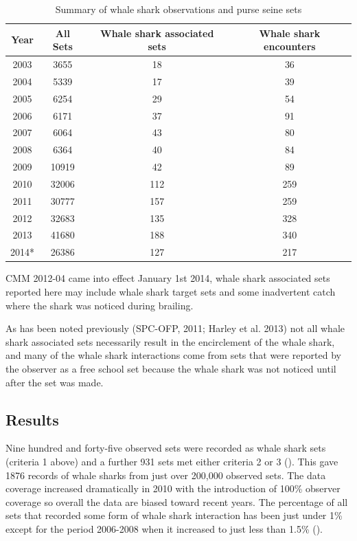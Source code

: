 \documentclass[12pt]{SCreport}
\begin{document}
\begin{table}[!h]
\label{tbl:whaleshark}
\begin{center}
\begin{tabular}{c|c|c|c}
Year & All Sets & Whale shark associated sets & Whale shark encounters\\
\hline
\hline
2003&	3655&	18&	36\\
2004&	5339&	17&	39\\
2005&	6254&	29&	54\\
2006&	6171&	37&	91\\
2007&	6064&	43&	80\\
2008&	6364&	40&	84\\
2009&	10919&	42&	89\\
2010&	32006&	112&	259\\
2011&	30777&	157&	259\\
2012&	32683&	135&	328\\
2013&	41680&	188&	340\\
2014*&	26386&	127&	217\\
\hline
\end{tabular}
\caption{Summary of whale shark observations and purse seine sets} 
\end{center}
\end{table}

CMM 2012-04 came into effect January 1st 2014, whale shark associated sets reported here may include whale shark target sets and some inadvertent catch where the shark was noticed during brailing.

As has been noted previously (SPC-OFP, 2011; Harley et al. 2013) not all whale shark associated sets necessarily result in the encirclement of the whale shark, and many of the whale shark interactions come from sets that were reported by the observer as a free school set because the whale shark was not noticed until after the set was made. 

\subsection{Results}
Nine hundred and forty-five observed sets were recorded as whale shark sets (criteria 1 above) and a further 931 sets met either criteria 2 or 3 (). This gave 1876 records of whale sharks from just over 200,000 observed sets. The data coverage increased dramatically in 2010 with the introduction of 100\% observer coverage so overall the data are biased toward recent years. The percentage of all sets that recorded some form of whale shark interaction has been just under 1\% except for the period 2006-2008 when it increased to just less than 1.5\% ().
\end{document}
